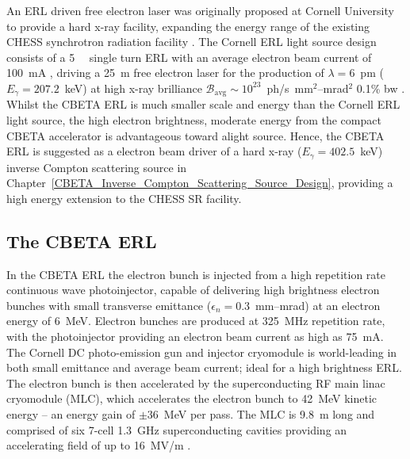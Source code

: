 \documentclass[../main.tex]{subfiles}
\begin{document}
An ERL driven free electron laser \cite{bazarov2003lattice,gruner2001study,bilderback2006status} was originally proposed at Cornell University to provide a hard x-ray facility, expanding the energy range of the existing CHESS synchrotron radiation facility \cite{batterman1979chess,CHESSstructuralmaterialsbeamline}. The Cornell ERL light source design consists of a 5~\si{\giga\electonvolt} single turn ERL with an average electron beam current of 100~\si{\milli\ampere} \cite{bazarov2003lattice,gruner2001study,bilderback2006status}, driving a 25~\si{\meter} free electron laser for the production of $\lambda = 6$~\si{\pico\meter} ($E_{\gamma} = 207.2$~\si{\kilo\electronvolt}) at high x-ray brilliance $\mathcal{B}_{\mathrm{avg}}\sim 10^{23}$~ph/\si{\second}~\si{\milli\meter}$^{2}$--\si{\milli\radian}$^{2}$ 0.1\% bw \cite{bilderback2006status}. Whilst the CBETA ERL is much smaller scale and energy than the Cornell ERL light source, the high electron brightness, moderate energy from the compact CBETA accelerator is advantageous toward alight source. Hence, the CBETA ERL is suggested as a electron beam driver of a hard x-ray ($E_{\gamma} = 402.5$~\si{\kilo\electronvolt}) inverse Compton scattering source in Chapter~\ref{CBETA_Inverse_Compton_Scattering_Source_Design}, providing a high energy extension to the CHESS SR facility.

\subsection{The CBETA ERL}

In the CBETA ERL the electron bunch is injected from a high repetition rate continuous wave photoinjector, capable of delivering high brightness electron bunches with small transverse emittance ($\epsilon_{n} = 0.3$~\si{\milli\meter}--\si{\milli\radian}) at an electron energy of 6~\si{\mega\electronvolt}. Electron bunches are produced at 325~\si{\mega\hertz} repetition rate, with the photoinjector providing an electron beam current as high as 75~\si{\milli\ampere}. The Cornell DC photo-emission gun and injector cryomodule is world-leading in both small emittance and average beam current; ideal for a high brightness ERL. The electron bunch is then accelerated by the superconducting RF main linac cryomodule (MLC), which accelerates the electron bunch to 42~\si{\mega\electronvolt} kinetic energy -- an energy gain of $\pm 36$~\si{\mega\electronvolt} per pass. The MLC is 9.8~\si{\meter} long and comprised of six 7-cell 1.3~\si{\giga\hertz} superconducting cavities providing an accelerating field of up to 16~\si{\mega\volt}/\si{\meter} \cite{hoffstaetter2017cbeta}.
\end{document}
